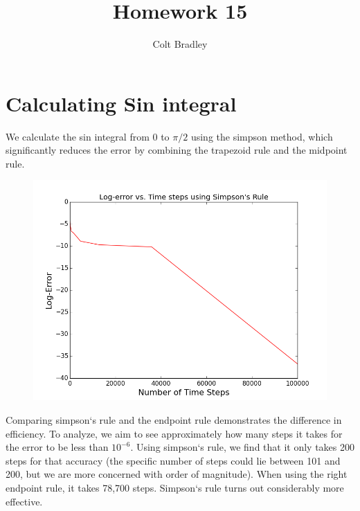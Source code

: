 \documentclass[11pt]{article}
\begin{document}
\title{Homework 15}
\author{Colt Bradley}
\date{}
\maketitle

\section{Calculating Sin integral}

We calculate the sin integral from $0$ to $\pi /2$ using the simpson method, which significantly reduces the error by combining the trapezoid rule and the midpoint rule. 

\begin{figure}[ht]
\centering
\includegraphics[scale=.5]{sin_nts.png}
\end{figure}

Comparing simpson`s rule and the endpoint rule demonstrates the difference in efficiency. To analyze, we aim to see approximately how many steps it takes for the error to be less than $10^{-6}$. Using simpson`s rule, we find that it only takes 200 steps for that accuracy (the specific number of steps could lie between 101 and 200, but we are more concerned with order of magnitude). When using the right endpoint rule, it takes 78,700 steps. Simpson`s rule turns out considerably more effective.  
\end{document}

